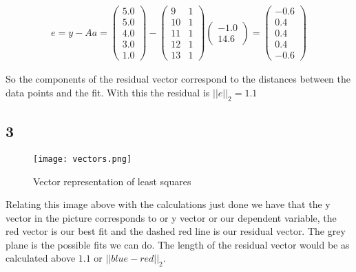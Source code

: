 \documentclass[a4paper]{article}
\begin{document}
\begin{align*}
    e = y-Aa = \begin{pmatrix}
        5.0\\
        5.0\\
        4.0\\
        3.0\\
        1.0
    \end{pmatrix} - \begin{pmatrix}
        9 & 1\\
        10 & 1\\
        11 & 1\\
        12 & 1\\
        13 & 1
    \end{pmatrix} \begin{pmatrix}
        -1.0\\
        14.6
    \end{pmatrix} = \begin{pmatrix}
        -0.6\\
        0.4\\
        0.4\\
        0.4\\
        -0.6
    \end{pmatrix}
\end{align*}

So the components of the residual vector correspond to the distances between the data points and the fit. With this the residual is $||e||_2 = 1.1$

\subsection*{3}

\begin{figure}[H]
    \begin{small}
        \begin{center}
            \texttt{[image: vectors.png]}
        \end{center}
        \caption{Vector representation of least squares}
        \label{fig:vectors}
    \end{small}
\end{figure}

Relating this image above with the calculations just done we have that the y vector in the picture corresponds to or y vector or our dependent variable, the red vector is our best fit and the dashed red line is our residual vector. The grey plane is the possible fits we can do. The length of the residual vector would be as calculated above $1.1$ or $||blue-red||_2$.
\end{document}
